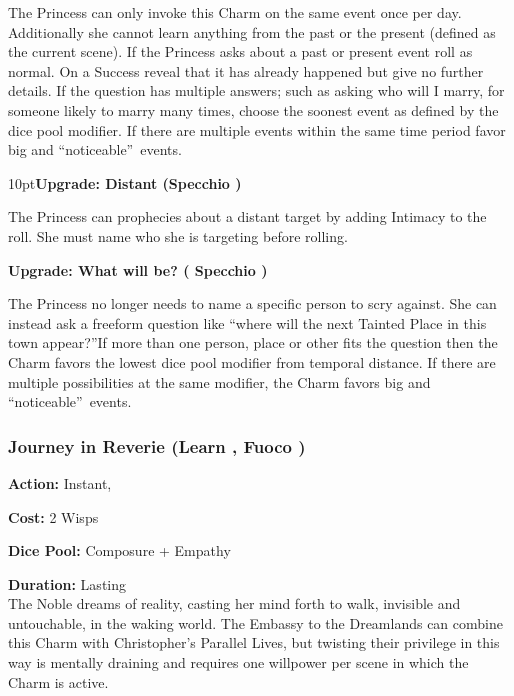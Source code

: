 The Princess can only invoke this Charm on the same event once per day. Additionally she cannot learn anything from the past or the present (defined as the current scene). If the Princess asks about a past or present event roll as normal. On a Success reveal that it has already happened but give no further details. If the question has multiple answers; such as asking who will I marry, for someone likely to marry many times, choose the soonest event as defined by the dice pool modifier. If there are multiple events within the same time period favor big and \textquotedblleft noticeable\textquotedblright\, events.

\begin{myindentpar}{10pt}\textbf{Upgrade: Distant (Specchio \textbullet\textbullet\textbullet\textbullet)}

The Princess can prophecies about a distant target by adding Intimacy to the roll. She must name who she is targeting before rolling.

\textbf{Upgrade: What will be? ( Specchio \textbullet\textbullet\textbullet\textbullet\textbullet)}

The Princess no longer needs to name a specific person to scry against. She can instead ask a freeform question like \textquotedblleft where will the next Tainted Place in this town appear?\textquotedblright If more than one person, place or other fits the question then the Charm favors the lowest dice pool modifier from temporal distance. If there are multiple possibilities at the same modifier, the Charm favors big and \textquotedblleft noticeable\textquotedblright\, events. \end{myindentpar}

\subsubsection*{Journey in Reverie (Learn \textbullet\textbullet\textbullet\textbullet, Fuoco \textbullet\textbullet\textbullet)}

\noindent \textbf{Action:} Instant, 

\noindent \textbf{Cost:} 2 Wisps

\noindent \textbf{Dice Pool:} Composure + Empathy

\noindent \textbf{Duration:} Lasting \\

\noindent The Noble dreams of reality, casting her mind forth to walk, invisible and untouchable, in the waking world. The Embassy to the Dreamlands can combine this Charm with Christopher's Parallel Lives, but twisting their privilege in this way is mentally draining and requires one willpower per scene in which the Charm is active.


